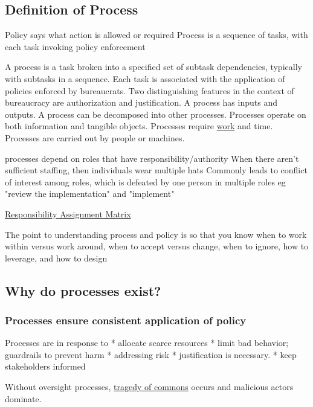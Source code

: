 \subsection{Definition of Process}

Policy says what action is allowed or required
Process is a sequence of tasks, with each task invoking policy enforcement 


A \gls{process} is a task broken into a specified set of subtask dependencies, typically with subtasks in a sequence. 
Each task is associated with the application of policies enforced by bureaucrats. 
Two distinguishing features in the context of bureaucracy are authorization and justification.  
A process has inputs and outputs. 
A process can be decomposed into other processes. 
Processes operate on both information and tangible objects. 
Processes require \href{https://en.wikipedia.org/wiki/Work_(physics)}{work} and time. 
Processes are carried out by people or machines.

processes depend on roles that have responsibility/authority
When there aren't sufficient staffing, then individuals wear multiple hats
Commonly leads to conflict of interest among roles, which is defeated by one person in multiple roles
eg "review the implementation" and "implement"

\href{https://en.wikipedia.org/wiki/Responsibility_assignment_matrix}{Responsibility Assignment Matrix}

The point to understanding process and policy is so that you know when to work within versus work around, when to accept versus change, when to ignore, how to leverage, and how to design


\subsection{Why do processes exist?}


\subsubsection{Processes ensure consistent application of policy}

Processes are in response to
* allocate scarce resources
   * limit bad behavior; guardrails to prevent harm
   * addressing risk
       * justification is necessary. 
   * keep stakeholders informed

    
Without oversight processes, \href{https://en.wikipedia.org/wiki/Tragedy_of_the_commons}{tragedy of commons} occurs and malicious actors dominate.


